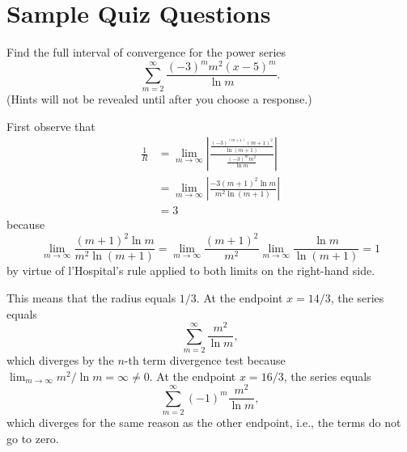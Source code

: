\documentclass{ximera}
\begin{document}
\section*{Sample Quiz Questions}
\begin{question}%

Find the full interval of convergence for the power series \[\sum_{m=2}^{\infty} \frac{(-3)^mm^2(x - 5)^m }{\ln m}.\]
(Hints will not be revealed until after you choose a response.)
\begin{multiplechoice}
\choice{\(\displaystyle \left[\frac{14}{3},\frac{16}{3}\right)\)}
\choice{\(\displaystyle \left(2,8\right]\)}
\choice{\(\displaystyle \left[2,8\right]\)}
\choice{\(\displaystyle \left(-\infty,\infty\right)\)}
\end{multiplechoice}
\begin{feedback}
First observe that 
\[\begin{aligned}
\frac{1}{R} & = \lim_{m\rightarrow \infty} \left| \frac{\frac{(-3)^{(m+1)}{(m+1)}^2 }{\ln {(m+1)}} }{\frac{(-3)^mm^2 }{\ln m}} \right| \\
& = \lim_{m\rightarrow \infty} \left| \frac{-3{(m+1)}^2\ln m }{m^2\ln {(m+1)} } \right| \\
& = 3
\end{aligned}\]
because \[\lim_{m \rightarrow \infty} \frac{(m+1)^2 \ln m}{m^2 \ln (m+1)} = \lim_{m \rightarrow \infty} \frac{(m+1)^2}{m^2} \lim_{m \rightarrow \infty} \frac{\ln m}{\ln (m+1)} = 1\] by virtue of l'Hospital's rule applied to both limits on the right-hand side.
\begin{hint}
This means that the radius equals \(1/3\). At the endpoint \(x=14/3\), the series equals \[\sum_{m=2}^{\infty} \frac{m^2 }{\ln m },\] which diverges by the \(n\)-th term divergence test because \(\lim_{m \rightarrow \infty} m^{2} / \ln m = \infty \neq 0\). At the endpoint \(x=16/3\), the series equals \[\sum_{m=2}^{\infty} (-1)^m\frac{m^2 }{\ln m },\] which diverges for the same reason as the other endpoint, i.e., the terms do not go to zero.
\end{hint}
\end{feedback}

\end{question}
\end{document}
